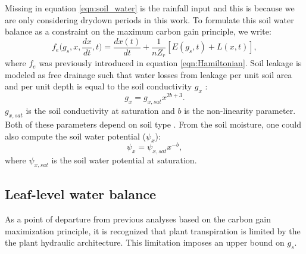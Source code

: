 \documentclass[utf8]{frontiersSCNS} %
\begin{document}
Missing in equation \ref{eqn:soil_water} is the rainfall input and this is because we are only considering drydown periods in this work. To formulate this soil water balance as a constraint on the maximum carbon gain principle, we write:
\begin{equation}
    \label{eqn:soil_water_constraint}
    f_e\Big(g_s, x, \frac{dx}{dt}, t\Big) = \frac{dx(t)}{dt} + \frac{1}{n Z_r}[ E(g_s, t) + L(x, t)],
\end{equation}
where $f_e$ was previously introduced in equation \ref{eqn:Hamiltonian}. Soil leakage is modeled as free drainage such that water losses from leakage per unit soil area and per unit depth is equal to the soil conductivity $g_x$ \citep{campbell1974}:
\begin{equation}
    \label{eqn:soil_cond}
    g_x = g_{x,sat}x^{2b+3}.
\end{equation}
$g_{x,sat}$ is the soil conductivity at saturation and $b$ is the non-linearity parameter. Both of these parameters depend on soil type \citep{Clapp1978}. From the soil moisture, one could also compute the soil water potential ($\psi_x$):
\begin{equation}
    \label{eqn:Clapp_pot}
    \psi_x = \psi_{x,sat}x^{-b},
\end{equation}
where $\psi_{x,sat}$ is the soil water potential at saturation.

\subsection{Leaf-level water balance}

As a point of departure from previous analyses based on the carbon gain maximization principle, it is recognized that plant transpiration is limited by the the plant hydraulic architecture. This limitation imposes an upper bound on $g_s$. 

\end{document}
